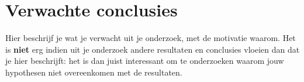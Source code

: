 \documentclass[fleqn,10pt]{voorstel}
\begin{document}
\section{Verwachte conclusies}
\label{sec:verwachte_conclusies}

Hier beschrijf je wat je verwacht uit je onderzoek, met de motivatie waarom. Het is \textbf{niet} erg indien uit je onderzoek andere resultaten en conclusies vloeien dan dat je hier beschrijft: het is dan juist interessant om te onderzoeken waarom jouw hypothesen niet overeenkomen met de resultaten.


\printbibliography[heading=bibintoc]
\end{document}
